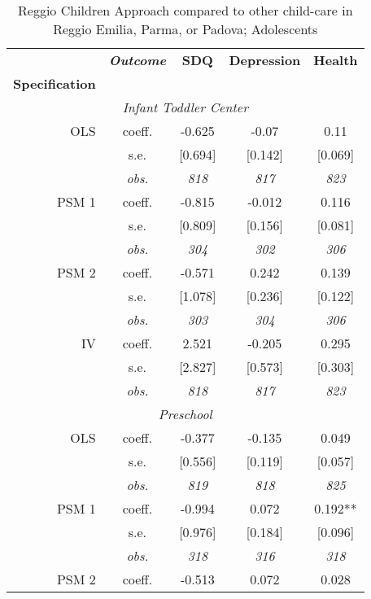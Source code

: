 \begin{table}[H] 
\caption{Reggio Children Approach compared to other child-care in Reggio Emilia, Parma, or Padova; Adolescents}
\label{tab:resultsAdo-all}
 \begin{centering} 
\vspace{1ex}
\begin{tabular}{ r c ccc} 
\hline \hline 
 & \textbf{\textit{Outcome}} & \textbf{SDQ}  & \textbf{Depression} & \textbf{Health}  \\ 
\textbf{Specification}  &  &  &  &  \\ 
\hline 
\multicolumn{5}{c}{\textit{Infant Toddler Center }} \\ 
\hline 

OLS	 & coeff.	 & -0.625	 & -0.07	 & 0.11	\\
	 & s.e.	 & [0.694]	 & [0.142]	 & [0.069]	\\
	 & \textit{obs.}	 & \textit{818}	 & \textit{817}	 & \textit{823}	\\
PSM 1	 & coeff.	 & -0.815	 & -0.012	 & 0.116	\\
	 & s.e.	 & [0.809]	 & [0.156]	 & [0.081]	\\
	 & \textit{obs.}	 & \textit{304}	 & \textit{302}	 & \textit{306}	\\
PSM 2	 & coeff.	 & -0.571	 & 0.242	 & 0.139	\\
	 & s.e.	 & [1.078]	 & [0.236]	 & [0.122]	\\
	 & \textit{obs.}	 & \textit{303}	 & \textit{304}	 & \textit{306}	\\
IV	 & coeff.	 & 2.521	 & -0.205	 & 0.295	\\
	 & s.e.	 & [2.827]	 & [0.573]	 & [0.303]	\\
	 & \textit{obs.}	 & \textit{818}	 & \textit{817}	 & \textit{823}	\\
\hline \multicolumn{5}{c}{\textit{Preschool }} \\ \hline
OLS	 & coeff.	 & -0.377	 & -0.135	 & 0.049	\\
	 & s.e.	 & [0.556]	 & [0.119]	 & [0.057]	\\
	 & \textit{obs.}	 & \textit{819}	 & \textit{818}	 & \textit{825}	\\
PSM 1	 & coeff.	 & -0.994	 & 0.072	 & 0.192**	\\
	 & s.e.	 & [0.976]	 & [0.184]	 & [0.096]	\\
	 & \textit{obs.}	 & \textit{318}	 & \textit{316}	 & \textit{318}	\\
PSM 2	 & coeff.	 & -0.513	 & 0.072	 & 0.028	\\

\end{tabular}
\end{centering}
\end{table}
